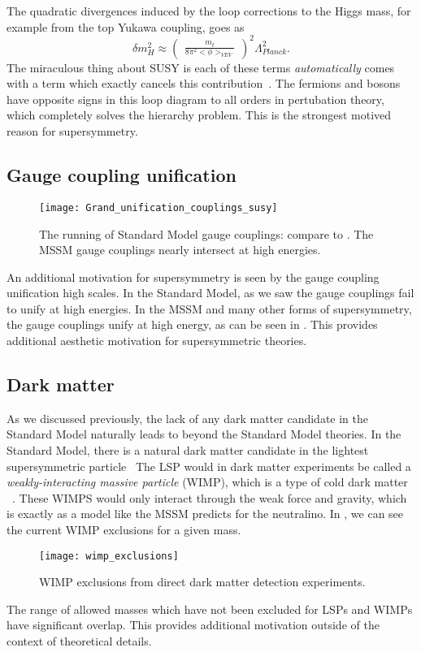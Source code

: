 The quadratic divergences induced by the loop corrections to the Higgs mass, for example from the top Yukawa coupling, goes as
\begin{equation}
\delta m^2_H \approx \begin{pmatrix} \frac{m_t}{8\pi^2 <\phi>_{VEV}} \end{pmatrix}^2 \Lambda_{Planck}^2.
\end{equation}
The miraculous thing about SUSY is each of these terms \textit{automatically} comes with a term which exactly cancels this contribution~\cite{susyPrimer}.
The fermions and bosons have opposite signs in this loop diagram to all orders in pertubation theory, which completely solves the hierarchy problem.
This is the strongest motived reason for supersymmetry.

\subsection{Gauge coupling unification}
\begin{figure}
\caption{The running of Standard Model gauge couplings: compare to .  The MSSM gauge couplings nearly intersect at high energies.}\label{fig:susy_gauge_coupling}
\texttt{[image: Grand\_unification\_couplings\_susy]}
\end{figure}

An additional motivation for supersymmetry is seen by the gauge coupling unification high scales.
In the Standard Model, as we saw the gauge couplings fail to unify at high energies.
In the MSSM and many other forms of supersymmetry, the gauge couplings unify at high energy, as can be seen in .
This provides additional aesthetic motivation for supersymmetric theories.

\subsection{Dark matter}

As we discussed previously, the lack of any dark matter candidate in the Standard Model naturally leads to beyond the Standard Model theories.
In the Standard Model, there is a natural dark matter candidate in the lightest supersymmetric particle~\cite{susyPrimer}
The LSP would in dark matter experiments be called a  \textit{weakly-interacting massive particle} (WIMP), which is a type of cold dark matter ~\cite{darkMatterPrimer,Klasen:2015uma}.
These WIMPS would only interact through the weak force and gravity, which is exactly as a model like the MSSM predicts for the neutralino.
In , we can see the current WIMP exclusions for a given mass.
\begin{figure}
\caption{WIMP exclusions from direct dark matter detection experiments.}\label{fig:wimp_exclusions}
\texttt{[image: wimp\_exclusions]}
\end{figure}
The range of allowed masses which have not been excluded for LSPs and WIMPs have significant overlap.
This provides additional motivation outside of the context of theoretical details.

